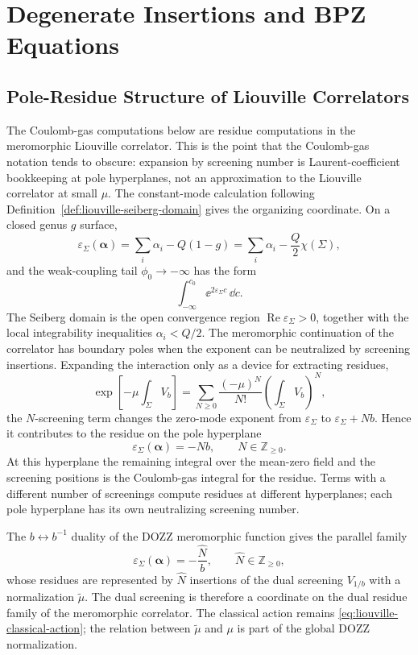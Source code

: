 \section{Degenerate Insertions and BPZ Equations}

\subsection{Pole-Residue Structure of Liouville Correlators}
\label{subsec:liouville-pole-residue-structure}

The Coulomb-gas computations below are residue computations in the
meromorphic Liouville correlator.  This is the point that the Coulomb-gas
notation tends to obscure: expansion by screening number is Laurent-coefficient
bookkeeping at pole hyperplanes, not an approximation to the Liouville
correlator at small \(\mu\).  The constant-mode calculation following
Definition~\ref{def:liouville-seiberg-domain} gives the organizing
coordinate.  On a closed genus \(g\) surface,
\[
  \varepsilon_\Sigma(\boldsymbol\alpha)
  =
  \sum_i\alpha_i-Q(1-g)
  =
  \sum_i\alpha_i-\frac Q2\chi(\Sigma),
\]
and the weak-coupling tail \(\phi_0\to-\infty\) has the form
\[
  \int_{-\infty}^{c_0}
  \ee^{2\varepsilon_\Sigma c}\,\dd c .
\]
The Seiberg domain is the open convergence region
\(\operatorname{Re}\varepsilon_\Sigma>0\), together with the local
integrability inequalities \(\alpha_i<Q/2\).  The meromorphic continuation of
the correlator has boundary poles when the exponent can be neutralized by
screening insertions.  Expanding the interaction only as a device for
extracting residues,
\[
  \exp\!\left[-\mu\int_\Sigma V_b\right]
  =
  \sum_{N\ge0}
  \frac{(-\mu)^N}{N!}
  \left(\int_\Sigma V_b\right)^N,
\]
the \(N\)-screening term changes the zero-mode exponent from
\(\varepsilon_\Sigma\) to \(\varepsilon_\Sigma+Nb\).  Hence it contributes to
the residue on the pole hyperplane
\begin{equation}
  \varepsilon_\Sigma(\boldsymbol\alpha)=-Nb,
  \qquad N\in\mathbb Z_{\ge0}.
  \label{eq:liouville-b-screening-poles}
\end{equation}
At this hyperplane the remaining integral over the mean-zero field and the
screening positions is the Coulomb-gas integral for the residue.  Terms with
a different number of screenings compute residues at different hyperplanes;
each pole hyperplane has its own neutralizing screening number.

The \(b\leftrightarrow b^{-1}\) duality of the DOZZ meromorphic function
gives the parallel family
\begin{equation}
  \varepsilon_\Sigma(\boldsymbol\alpha)=-\frac{\widehat N}{b},
  \qquad \widehat N\in\mathbb Z_{\ge0},
  \label{eq:liouville-dual-screening-poles}
\end{equation}
whose residues are represented by \(\widehat N\) insertions of the dual
screening \(V_{1/b}\) with a normalization
\(\widetilde\mu\).  The dual screening is therefore a coordinate on the
dual residue family of the meromorphic correlator.  The classical action
remains \eqref{eq:liouville-classical-action}; the relation between
\(\widetilde\mu\) and \(\mu\) is part of the global DOZZ normalization.

